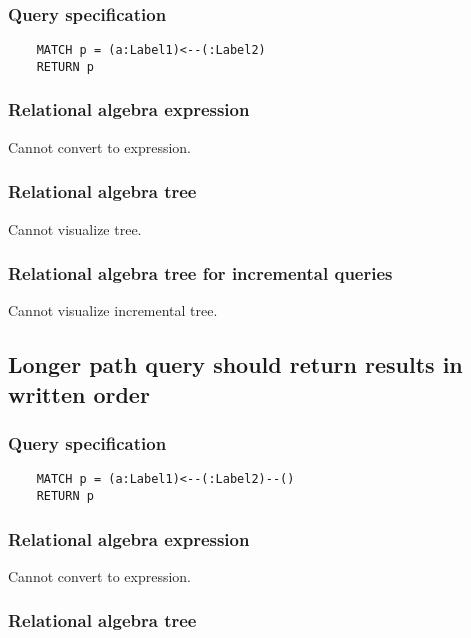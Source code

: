 	\subsubsection*{Query specification}

	\begin{lstlisting}
	MATCH p = (a:Label1)<--(:Label2)
	RETURN p
	\end{lstlisting}


	\subsubsection*{Relational algebra expression}

	Cannot convert to expression.

	\subsubsection*{Relational algebra tree}

	Cannot visualize tree.

	\subsubsection*{Relational algebra tree for incremental queries}

	Cannot visualize incremental tree.
	\subsection{Longer path query should return results in written order}

	\subsubsection*{Query specification}

	\begin{lstlisting}
	MATCH p = (a:Label1)<--(:Label2)--()
	RETURN p
	\end{lstlisting}


	\subsubsection*{Relational algebra expression}

	Cannot convert to expression.

	\subsubsection*{Relational algebra tree}

